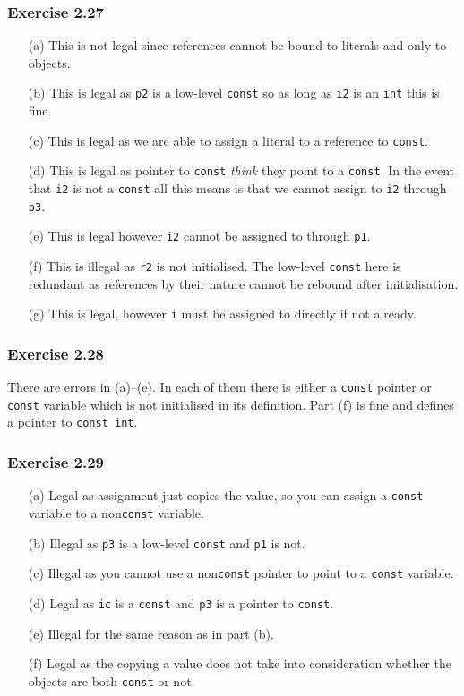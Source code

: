 \documentclass[12pt, a4paper]{article}
\begin{document}
\subsubsection*{Exercise 2.27}
\begin{itemize}
	\item [(a)]
		This is not legal since references cannot be bound to literals and only to objects.
	\item [(b)]
		This is legal as \texttt{p2} is a low-level \texttt{const} so as long as \texttt{i2} is an \texttt{int} this is fine.
	\item [(c)]
		This is legal as we are able to assign a literal to a reference to \texttt{const}.
	\item [(d)]
		This is legal as pointer to \texttt{const} \textit{think} they point to a \texttt{const}. In the event that \texttt{i2} is not a \texttt{const} all this means is that we cannot assign to \texttt{i2} through \texttt{p3}.
	\item [(e)]
		This is legal however \texttt{i2} cannot be assigned to through \texttt{p1}.
	\item [(f)]
		This is illegal as \texttt{r2} is not initialised. The low-level \texttt{const} here is redundant as references by their nature cannot be rebound after initialisation.
	\item [(g)]
		This is legal, however \texttt{i} must be assigned to directly if not already.
\end{itemize}

\subsubsection*{Exercise 2.28}
There are errors in (a)--(e). In each of them there is either a \texttt{const} pointer or \texttt{const} variable which is not initialised in its definition. Part (f) is fine and defines a pointer to \texttt{const int}.

\subsubsection*{Exercise 2.29}
\begin{itemize}
	\item [(a)]
		Legal as assignment just copies the value, so you can assign a \texttt{const} variable to a non\texttt{const} variable.
	\item [(b)]
		Illegal as \texttt{p3} is a low-level \texttt{const} and \texttt{p1} is not.
	\item [(c)]
		Illegal as you cannot use a non\texttt{const} pointer to point to a \texttt{const} variable.
	\item [(d)]
		Legal as \texttt{ic} is a \texttt{const} and \texttt{p3} is a pointer to \texttt{const}.
	\item [(e)]
		Illegal for the same reason as in part (b).
	\item [(f)]
		Legal as the copying a value does not take into consideration whether the objects are both \texttt{const} or not.
\end{itemize}
\end{document}
